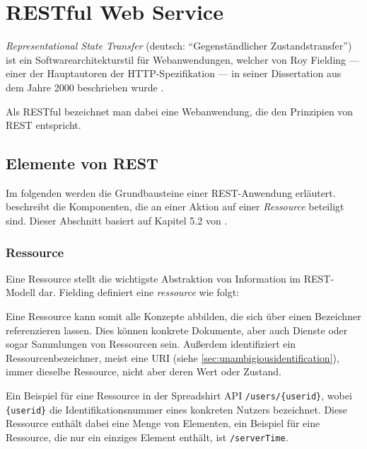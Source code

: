 \section{RESTful Web Service}
\label{sec:rest}

\emph{Representational State Transfer} (deutsch: \enquote{Gegenständlicher Zustandstransfer}) ist ein Softwarearchitekturstil für Webanwendungen, welcher von Roy Fielding --- einer der Hauptautoren der \gls{HTTP}-Spezifikation --- in seiner Dissertation aus dem Jahre 2000  beschrieben wurde \cite[Kapitel 5][95 ff.]{fieldingDissertation}. 

Als \gls{RESTful} bezeichnet man dabei eine Webanwendung, die den Prinzipien von \gls{REST} entspricht. 

\subsection{Elemente von REST}

Im folgenden werden die Grundbausteine einer \gls{REST}-Anwendung erläutert.  beschreibt die Komponenten, die an einer Aktion auf einer \emph{Ressource} beteiligt sind. Dieser Abschnitt basiert auf Kapitel 5.2 von \cite[][S. 86 ff.]{fieldingDissertation}.

\subsubsection{Ressource}

Eine Ressource stellt die wichtigste Abstraktion von Information im \gls{REST}-Modell dar. Fielding definiert eine \emph{ressource} wie folgt:


Eine Ressource kann somit alle Konzepte abbilden, die sich über einen Bezeichner referenzieren lassen. Dies können konkrete Dokumente, aber auch Dienste oder sogar Sammlungen von Ressourcen sein.
Außerdem identifiziert ein Ressourcenbezeichner, meist eine \gls{URI} (siehe \cref{sec:unambigiousidentification}), immer dieselbe Ressource, nicht aber deren Wert oder Zustand.

Ein Beispiel für eine Ressource in der Spreadshirt \gls{API} \texttt{/users/\{userid\}}, wobei \texttt{\{userid\}} die Identifikationsnummer eines konkreten Nutzers bezeichnet. Diese Ressource enthält dabei eine Menge von Elementen, ein Beispiel für eine Ressource, die nur ein einziges Element enthält, ist \texttt{/serverTime}. 

